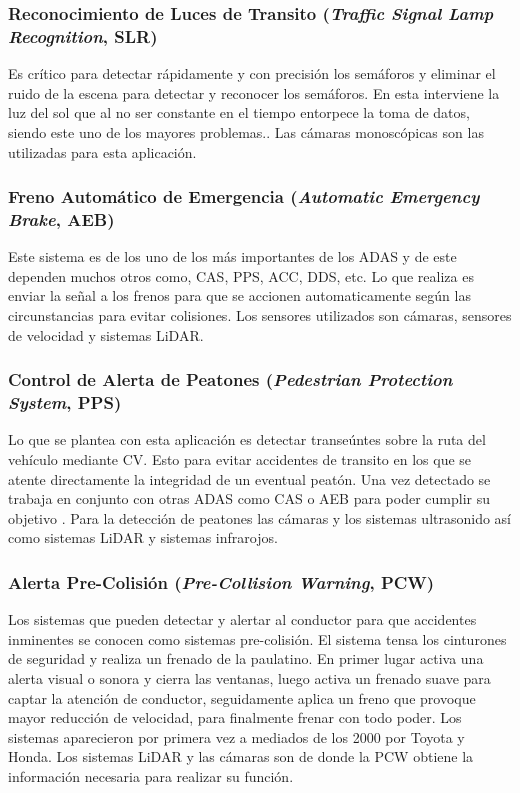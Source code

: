 \subsubsection{Reconocimiento de Luces de Transito {\footnotesize(\textit{Traffic Signal Lamp Recognition}, SLR)}}

Es crítico para detectar rápidamente y con precisión los semáforos y eliminar el ruido de la escena para detectar y reconocer los semáforos. En esta interviene la luz del sol que al no ser constante en el tiempo entorpece la toma de datos, siendo este uno de los mayores problemas.\cite{Wang2017}. Las cámaras monoscópicas son las utilizadas para esta aplicación. 

\subsubsection{Freno Automático de Emergencia {\footnotesize(\textit{Automatic Emergency Brake}, AEB)}}

Este sistema es de los uno de los más importantes de los ADAS y de este dependen muchos otros como, CAS, PPS, ACC, DDS, etc. Lo que realiza es enviar la señal a los frenos para que se accionen automaticamente según las circunstancias para evitar colisiones\cite{Hosseini2016}. Los sensores utilizados son cámaras, sensores de velocidad y sistemas LiDAR. 

\newpage

\subsubsection{Control de Alerta de Peatones {\footnotesize(\textit{Pedestrian Protection System}, PPS)}}

Lo que se plantea con esta aplicación es detectar transeúntes sobre la ruta del vehículo mediante CV. Esto para evitar accidentes de transito en los que se atente directamente la integridad de un eventual peatón. Una vez detectado se trabaja en conjunto con otras ADAS como CAS o AEB para poder cumplir su objetivo \cite{Kuo2016}. Para la detección de peatones las cámaras y los sistemas ultrasonido así como sistemas LiDAR y sistemas infrarojos.


\subsubsection{Alerta Pre-Colisión {\footnotesize(\textit{Pre-Collision Warning}, PCW)}}

Los sistemas que pueden detectar y alertar al conductor para que accidentes inminentes se conocen como sistemas pre-colisión. El sistema tensa los cinturones de seguridad y realiza un frenado de la paulatino. En primer lugar activa una alerta visual o sonora y cierra las ventanas, luego activa un frenado suave para captar la atención de conductor, seguidamente aplica un freno que provoque mayor reducción de velocidad, para finalmente frenar con todo poder\cite{Thakur2016}. Los sistemas aparecieron por primera vez a mediados de los 2000 por Toyota y Honda. Los sistemas LiDAR y las cámaras son de donde la PCW obtiene la información necesaria para realizar su función. 

